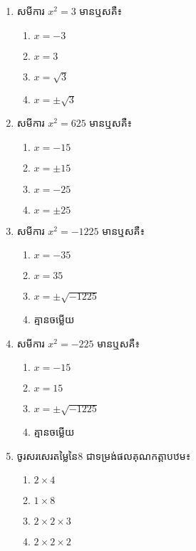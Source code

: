 \begin{enumerate}
\item សមីការ $x^2=3$ មានឬសគឺ៖
\begin{multicols}{4}
\begin{enumerate}[label=\alph*.]
	\item $x=-3$
	\item $x=3$
	\item $x=\sqrt{3}$
	\item $x=\pm \sqrt{3}$
\end{enumerate}
\end{multicols}

\item សមីការ $x^2=625$ មានឬសគឺ៖
\begin{multicols}{4}
\begin{enumerate}[label=\alph*.]
	\item $x=-15$
	\item $x=\pm 15$
	\item $x=-25$
	\item $x=\pm 25$
\end{enumerate}
\end{multicols}

\item សមីការ $x^2=-1225$ មានឬសគឺ៖
\begin{multicols}{4}
\begin{enumerate}[label=\alph*.]
	\item $x=-35$
	\item $x=35$
	\item $x=\pm \sqrt{-1225}$
	\item គ្មានចម្លើយ
\end{enumerate}
\end{multicols}

\item សមីការ $x^2=-225$ មានឬសគឺ៖
\begin{multicols}{4}
\begin{enumerate}[label=\alph*.]
	\item $x=-15$
	\item $x=15$
	\item $x=\pm \sqrt{-1225}$
	\item គ្មានចម្លើយ
\end{enumerate}
\end{multicols}

\item ចូរសរសេរតម្លៃនៃ$8$ ជាទម្រង់ផលគុណកត្តាបឋម៖
\begin{multicols}{4}
\begin{enumerate}[label=\alph*.]
	\item $2\times 4$
	\item $1\times 8$
	\item $2\times 2\times 3$
	\item $2\times 2\times 2$
\end{enumerate}
\end{multicols}


\end{enumerate}

